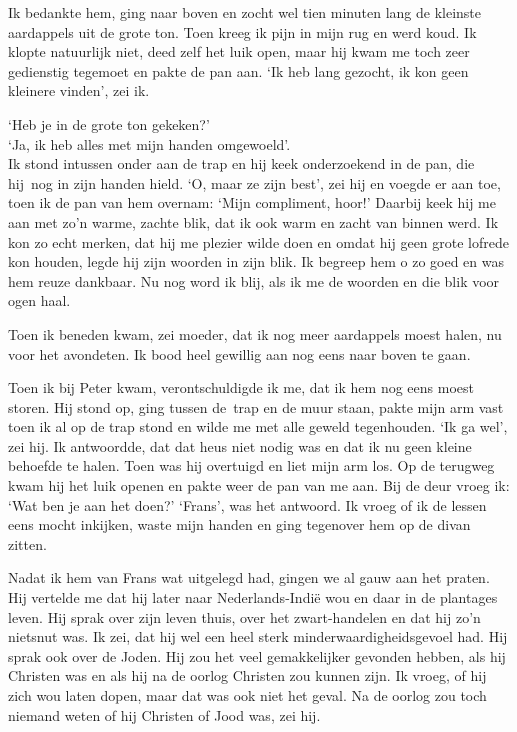 \documentclass{book}
\begin{document}
Ik bedankte hem, ging naar boven en zocht wel tien minuten lang de
kleinste aardappels uit de grote ton. Toen kreeg ik pijn in mijn rug en
werd koud. Ik klopte natuurlijk niet, deed zelf het luik open, maar hij
kwam me toch zeer gedienstig tegemoet en pakte de pan aan. `Ik heb lang
gezocht, ik kon geen kleinere vinden', zei ik.

`Heb je in de grote ton gekeken?'\\`Ja, ik heb alles met mijn handen
omgewoeld'.\\Ik stond intussen onder aan de trap en hij keek
onderzoekend in de pan, die hij~nog in zijn handen hield. `O, maar ze
zijn best', zei hij en voegde er aan toe, toen ik de pan van hem
overnam: `Mijn compliment, hoor!' Daarbij keek hij me aan met zo'n
warme, zachte blik, dat ik ook warm en zacht van binnen werd. Ik kon zo
echt merken, dat hij me plezier wilde doen en omdat hij geen grote
lofrede kon houden, legde hij zijn woorden in zijn blik. Ik begreep hem
o zo goed en was hem reuze dankbaar. Nu nog word ik blij, als ik me de
woorden en die blik voor ogen haal.

Toen ik beneden kwam, zei moeder, dat ik nog meer aardappels moest
halen, nu voor het avondeten. Ik bood heel gewillig aan nog eens naar
boven te gaan.

Toen ik bij Peter kwam, verontschuldigde ik me, dat ik hem nog eens
moest storen. Hij stond op, ging tussen de~trap en de muur staan, pakte
mijn arm vast toen ik al op de trap stond en wilde me met alle geweld
tegenhouden. `Ik ga wel', zei hij. Ik antwoordde, dat dat heus niet
nodig was en dat ik nu geen kleine behoefde te halen. Toen was hij
overtuigd en liet mijn arm los. Op de terugweg kwam hij het luik openen
en pakte weer de pan van me aan. Bij de deur vroeg ik: `Wat ben je aan
het doen?' `Frans', was het antwoord. Ik vroeg of ik de lessen eens
mocht inkijken, waste mijn handen en ging tegenover hem op de divan
zitten.

Nadat ik hem van Frans wat uitgelegd had, gingen we al gauw aan het
praten. Hij vertelde me dat hij later naar Nederlands-Indië wou en daar
in de plantages leven. Hij sprak over zijn leven thuis, over het
zwart-handelen en dat hij zo'n nietsnut was. Ik zei, dat hij wel een
heel sterk minderwaardigheidsgevoel had. Hij sprak ook over de Joden.
Hij zou het veel gemakkelijker gevonden hebben, als hij Christen was en
als hij na de oorlog Christen zou kunnen zijn. Ik vroeg, of hij zich wou
laten dopen, maar dat was ook niet het geval. Na de oorlog zou toch
niemand weten of hij Christen of Jood was, zei hij.
\end{document}
